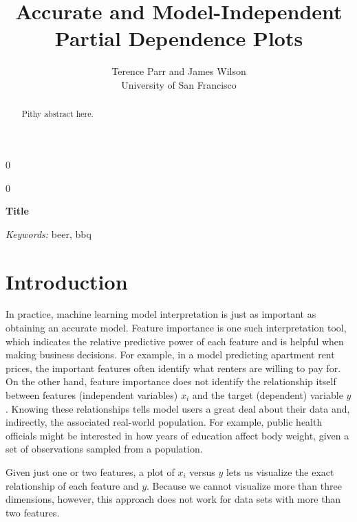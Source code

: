 \documentclass[12pt]{article}
\newcommand{\blind}{0}
\begin{document}
\def\spacingset#1{\renewcommand{\baselinestretch}%
{#1}\small\normalsize} \spacingset{1}



\blind
{
  \title{\bf Accurate and Model-Independent\\
  Partial Dependence Plots}

  \author{Terence Parr and James Wilson\\
      University of San Francisco\\
}
  \maketitle
} \fi

\blind
{
  \bigskip
  \bigskip
  \bigskip
  \begin{center}
    {\LARGE\bf Title}
\end{center}
  \medskip
} \fi

\bigskip
\begin{abstract}
Pithy abstract here.
\end{abstract}

\noindent%
{\it Keywords:} beer, bbq

\section{Introduction}
\label{sec:intro}

In practice, machine learning model interpretation is just as important as obtaining an accurate model. Feature importance is one such interpretation tool, which indicates the relative predictive power of each feature and is helpful when making business decisions. For example, in a model predicting apartment rent prices, the important features often identify what renters are willing to pay for. On the other hand, feature importance does not identify the relationship itself between features (independent variables) $x_i$ and the target (dependent) variable $y$.  Knowing these relationships tells model users a great deal about their data and, indirectly, the associated real-world population. For example, public health officials might be interested in how years of education affect body weight, given a set of observations sampled from a population.

Given just one or two features, a plot of $x_i$ versus $y$ lets us visualize the exact relationship of each feature and $y$.  Because we cannot visualize more than three dimensions, however, this approach does not work for data sets with more than two features.
\end{document}
